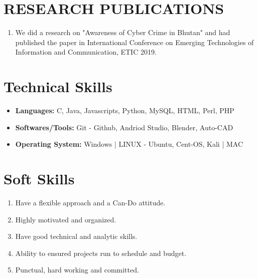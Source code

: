 \documentclass[10pt]{article}
\begin{document}
	\section{RESEARCH PUBLICATIONS}
	\begin{enumerate}
		\item We did a research on "Awareness of Cyber Crime in Bhutan" and had published the paper in International Conference on Emerging Technologies of Information and Communication, ETIC 2019.
	\end{enumerate}

	\section{Technical Skills}
	\begin{itemize}
		\item {\bf Languages: } C, Java, Javascripts, Python, MySQL,  HTML, Perl, PHP
		\item  {\bf Softwares/Tools: } Git - Github, Andriod Studio, Blender, Auto-CAD
		\item  {\bf Operating System: } Windows | LINUX - Ubuntu, Cent-OS, Kali | MAC
	\end{itemize}

	\section{Soft Skills}
	\begin{enumerate}
		\item  {Have a flexible approach and a Can-Do attitude. }
		\item  {Highly motivated and organized. }
		\item  {Have good technical and analytic skills. }
		\item  {Ability to ensured projects run to schedule and budget.}
		\item  {Punctual, hard working and committed.}
	\end{enumerate}
\end{document}
